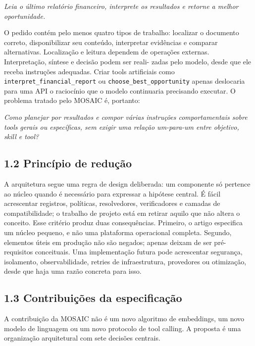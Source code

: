 \documentclass[12pt,a4paper]{article}
\begin{document}
\textit{Leia o último relatório financeiro, interprete os resultados e retorne a melhor oportunidade.}



O pedido contém pelo menos quatro tipos de trabalho: localizar o documento correto, disponibilizar seu conteúdo, interpretar evidências e comparar alternativas. Localização e leitura dependem de operações externas. Interpretação, síntese e decisão podem ser reali- zadas pelo modelo, desde que ele receba instruções adequadas. Criar tools artificiais como \nolinkurl{interpret_financial_report} ou \nolinkurl{choose_best_opportunity} apenas deslocaria para uma API o raciocínio que o modelo continuaria precisando executar. O problema tratado pelo MOSAIC é, portanto:


\textit{Como planejar por resultados e compor várias instruções comportamentais sobre tools} \textit{gerais ou específicas, sem exigir uma relação um-para-um entre objetivo, skill e tool?}


\subsection*{1.2 Princípio de redução}

A arquitetura segue uma regra de design deliberada: um componente só pertence ao núcleo quando é necessário para expressar a hipótese central. É fácil acrescentar registros, políticas, resolvedores, verificadores e camadas de compatibilidade; o trabalho de projeto está em retirar aquilo que não altera o conceito. Esse critério produz duas consequências. Primeiro, o artigo especifica um núcleo pequeno, e não uma plataforma operacional completa. Segundo, elementos úteis em produção não são negados; apenas deixam de ser pré-requisitos conceituais. Uma implementação futura pode acrescentar segurança, isolamento, observabilidade, retries de infraestrutura, provedores ou otimização, desde que haja uma razão concreta para isso.


\subsection*{1.3 Contribuições da especificação}

A contribuição da MOSAIC não é um novo algoritmo de embeddings, um novo modelo de linguagem ou um novo protocolo de tool calling. A proposta é uma organização arquitetural com sete decisões centrais.


\end{document}
